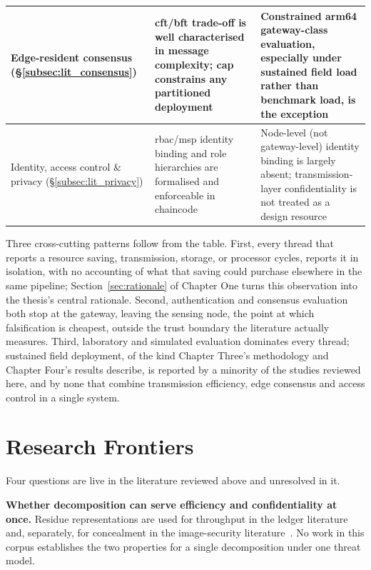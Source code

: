 \documentclass[12pt,a4paper,oneside]{book}
\begin{document}
\begin{table}[htbp]
\begin{tabularx}{\textwidth}{@{}p{}X X@{}}
\midrule
Edge-resident consensus (\S\ref{subsec:lit_consensus})
  & \gls{cft}/\gls{bft} trade-off is well characterised in message
    complexity; \gls{cap} constrains any partitioned deployment
  & Constrained \gls{arm64} gateway-class evaluation, especially under
    sustained field load rather than benchmark load, is the exception \\
\midrule
Identity, access control \& privacy (\S\ref{subsec:lit_privacy})
  & \gls{rbac}/\gls{msp} identity binding and role hierarchies are
    formalised and enforceable in chaincode
  & Node-level (not gateway-level) identity binding is largely absent;
    transmission-layer confidentiality is not treated as a design resource \\
\bottomrule
\end{tabularx}
\end{table}

Three cross-cutting patterns follow from the table. First, every thread
that reports a resource saving, transmission, storage, or processor
cycles, reports it in isolation, with no accounting of what that saving
could purchase elsewhere in the same pipeline; Section~\ref{sec:rationale}
of Chapter One turns this observation into the thesis's central rationale.
Second, authentication and consensus evaluation both stop at the gateway,
leaving the sensing node, the point at which falsification is cheapest,
outside the trust boundary the literature actually measures. Third,
laboratory and simulated evaluation dominates every thread; sustained
field deployment, of the kind Chapter Three's methodology and Chapter
Four's results describe, is reported by a minority of the studies
reviewed here, and by none that combine transmission efficiency, edge
consensus and access control in a single system.

\section{Research Frontiers}
\label{sec:lit_frontiers}

Four questions are live in the literature reviewed above and unresolved in it.

\textbf{Whether decomposition can serve efficiency and confidentiality at
once.} Residue representations are used for throughput in the ledger
literature~\cite{horvath2025assistedsharding, patel2023blockchainlayer} and,
separately, for concealment in the image-security
literature~\cite{yavuz2025reversibledata}. No work in this corpus establishes
the two properties for a single decomposition under one threat model.
\end{document}
